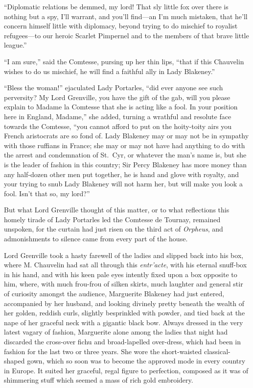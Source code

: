 \documentclass[paper=a5,BCOR=7mm,twoside,DIV=calc,12pt,usegeometry,chapterprefix,endperiod,headings=big]{scrbook}
\begin{document}
\enquote{Diplomatic relations be demmed, my lord! That sly little fox over there is nothing but a spy, I'll warrant, and you'll find---an I'm much mistaken, that he'll concern himself little with diplomacy, beyond trying to do mischief to royalist refugees---to our heroic Scarlet Pimpernel and to the members of that brave little league.}

\enquote{I am sure,} said the Comtesse, pursing up her thin lips, \enquote{that if this Chauvelin wishes to do us mischief, he will find a faithful ally in Lady Blakeney.}

\enquote{Bless the woman!} ejaculated Lady Portarles, \enquote{did ever anyone see such perversity? My Lord Grenville, you have the gift of the gab, will you please explain to Madame la Comtesse that she is acting like a fool. In your position here in England, Madame,} she added, turning a wrathful and resolute face towards the Comtesse, \enquote{you cannot afford to put on the hoity-toity airs you French aristocrats are so fond of. Lady Blakeney may or may not be in sympathy with those ruffians in France; she may or may not have had anything to do with the arrest and condemnation of St.~Cyr, or whatever the man's name is, but she is the leader of fashion in this country; Sir Percy Blakeney has more money than any half-dozen other men put together, he is hand and glove with royalty, and your trying to snub Lady Blakeney will not harm her, but will make you look a fool. Isn't that so, my lord?}

But what Lord Grenville thought of this matter, or to what reflections this homely tirade of Lady Portarles led the Comtesse de Tournay, remained unspoken, for the curtain had just risen on the third act of \textit{Orpheus}, and admonishments to silence came from every part of the house.

Lord Grenville took a hasty farewell of the ladies and slipped back into his box, where M. Chauvelin had sat all through this \textit{entr'acte}, with his eternal snuff-box in his hand, and with his keen pale eyes intently fixed upon a box opposite to him, where, with much frou-frou of silken skirts, much laughter and general stir of curiosity amongst the audience, Marguerite Blakeney had just entered, accompanied by her husband, and looking divinely pretty beneath the wealth of her golden, reddish curls, slightly besprinkled with powder, and tied back at the nape of her graceful neck with a gigantic black bow. Always dressed in the very latest vagary of fashion, Marguerite alone among the ladies that night had discarded the cross-over fichu and broad-lapelled over-dress, which had been in fashion for the last two or three years. She wore the short-waisted classical-shaped gown, which so soon was to become the approved mode in every country in Europe. It suited her graceful, regal figure to perfection, composed as it was of shimmering stuff which seemed a mass of rich gold embroidery.
\end{document}
